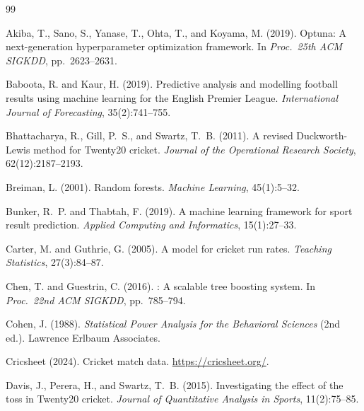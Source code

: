 \documentclass[10pt,a4paper,twocolumn]{article}
\begin{document}


\begin{thebibliography}{99}

Akiba, T., Sano, S., Yanase, T., Ohta, T., and Koyama, M. (2019).
\newblock Optuna: A next-generation hyperparameter optimization framework.
\newblock In \emph{Proc.\ 25th ACM SIGKDD}, pp.~2623--2631.

Baboota, R. and Kaur, H. (2019).
\newblock Predictive analysis and modelling football results using machine learning for the English Premier League.
\newblock \emph{International Journal of Forecasting}, 35(2):741--755.

Bhattacharya, R., Gill, P.~S., and Swartz, T.~B. (2011).
\newblock A revised Duckworth-Lewis method for Twenty20 cricket.
\newblock \emph{Journal of the Operational Research Society}, 62(12):2187--2193.

Breiman, L. (2001).
\newblock Random forests.
\newblock \emph{Machine Learning}, 45(1):5--32.

Bunker, R.~P. and Thabtah, F. (2019).
\newblock A machine learning framework for sport result prediction.
\newblock \emph{Applied Computing and Informatics}, 15(1):27--33.

Carter, M. and Guthrie, G. (2005).
\newblock A model for cricket run rates.
\newblock \emph{Teaching Statistics}, 27(3):84--87.

Chen, T. and Guestrin, C. (2016).
: A scalable tree boosting system.
\newblock In \emph{Proc.\ 22nd ACM SIGKDD}, pp.~785--794.

Cohen, J. (1988).
\newblock \emph{Statistical Power Analysis for the Behavioral Sciences} (2nd ed.).
\newblock Lawrence Erlbaum Associates.

Cricsheet (2024).
\newblock Cricket match data. \url{https://cricsheet.org/}.

Davis, J., Perera, H., and Swartz, T.~B. (2015).
\newblock Investigating the effect of the toss in Twenty20 cricket.
\newblock \emph{Journal of Quantitative Analysis in Sports}, 11(2):75--85.


\end{thebibliography}
\end{document}
